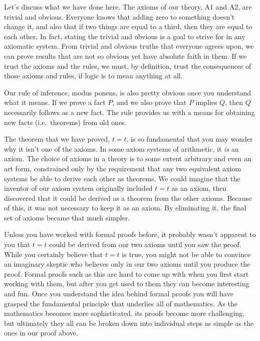 Let's discuss what we have done here.  The axioms of our theory,
A1 and A2, are trivial and obvious.  Everyone knows that adding zero to
something doesn't change it, and also that if two things are equal to a third,
then they are equal to each other. In fact, stating the trivial and obvious is
a goal to strive for in any axiomatic system.  From trivial and obvious truths
that everyone agrees upon, we can prove results that are not so obvious yet
have absolute faith in them.  If we trust the axioms and the rules, we must,
by definition, trust the consequences of those axioms and rules, if logic is
to mean anything at all.

Our rule of inference, modus ponens, is also
pretty obvious once you understand what it means.  If we prove a fact $P$, and
we also prove that $P$ implies $Q$, then $Q$ necessarily follows as a new
fact.  The rule provides us with a means for obtaining new facts (i.e.\
theorems) from old ones.

The theorem that we have proved, $ t=t$, is so fundamental that you may wonder
why it isn't one of the axioms\index{axiom}.  In some axiom systems of
arithmetic, it {\em is} an axiom.  The choice of axioms in a theory is to some
extent arbitrary and even an art form, constrained only by the requirement
that any two equivalent axiom systems be able to derive each other as
theorems.  We could imagine that the inventor of our axiom system originally
included $ t=t$ as an axiom, then discovered that it could be derived as a
theorem from the other axioms.  Because of this, it was not necessary to
keep it as an axiom.  By eliminating it, the final set of axioms became
that much simpler.

Unless you have worked with formal proofs before, it
probably wasn't apparent to you that $ t=t$ could be derived from our two
axioms until you saw the proof. While you certainly believe that $ t=t$ is
true, you might not be able to convince an imaginary skeptic who believes only
in our two axioms until you produce the proof.  Formal proofs such as this are
hard to come up with when you first start working with them, but after you get
used to them they can become interesting and fun.  Once you understand the
idea behind formal proofs you will have grasped the fundamental principle that
underlies all of mathematics.  As the mathematics becomes more sophisticated,
its proofs become more challenging, but ultimately they all can be broken down
into individual steps as simple as the ones in our proof above.

